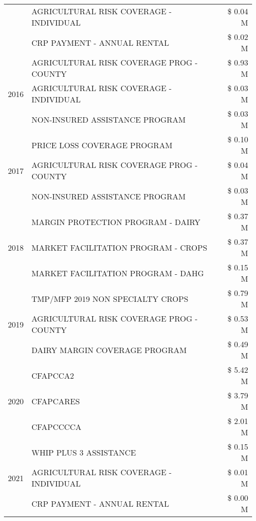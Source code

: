 \begin{tabular}{llr}
 & AGRICULTURAL RISK COVERAGE - INDIVIDUAL & \$ 0.04 M \\
 & CRP PAYMENT - ANNUAL RENTAL & \$ 0.02 M \\
\cline{1-3}
\multirow[t]{3}{*}{2016} & AGRICULTURAL RISK COVERAGE PROG - COUNTY & \$ 0.93 M \\
 & AGRICULTURAL RISK COVERAGE - INDIVIDUAL & \$ 0.03 M \\
 & NON-INSURED ASSISTANCE PROGRAM & \$ 0.03 M \\
\cline{1-3}
\multirow[t]{3}{*}{2017} & PRICE LOSS COVERAGE PROGRAM & \$ 0.10 M \\
 & AGRICULTURAL RISK COVERAGE PROG - COUNTY & \$ 0.04 M \\
 & NON-INSURED ASSISTANCE PROGRAM & \$ 0.03 M \\
\cline{1-3}
\multirow[t]{3}{*}{2018} & MARGIN PROTECTION PROGRAM - DAIRY & \$ 0.37 M \\
 & MARKET FACILITATION PROGRAM - CROPS & \$ 0.37 M \\
 & MARKET FACILITATION PROGRAM - DAHG & \$ 0.15 M \\
\cline{1-3}
\multirow[t]{3}{*}{2019} & TMP/MFP 2019 NON SPECIALTY CROPS & \$ 0.79 M \\
 & AGRICULTURAL RISK COVERAGE PROG - COUNTY & \$ 0.53 M \\
 & DAIRY MARGIN COVERAGE PROGRAM & \$ 0.49 M \\
\cline{1-3}
\multirow[t]{3}{*}{2020} & CFAPCCA2 & \$ 5.42 M \\
 & CFAPCARES & \$ 3.79 M \\
 & CFAPCCCCA & \$ 2.01 M \\
\cline{1-3}
\multirow[t]{3}{*}{2021} & WHIP PLUS 3 ASSISTANCE & \$ 0.15 M \\
 & AGRICULTURAL RISK COVERAGE - INDIVIDUAL & \$ 0.01 M \\
 & CRP PAYMENT - ANNUAL RENTAL & \$ 0.00 M \\
\cline{1-3}
\bottomrule
\end{tabular}
